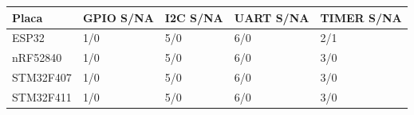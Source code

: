 \begin{tabular}{lllll}
\hline
Placa & GPIO S/NA & I2C S/NA & UART S/NA & TIMER S/NA \\
\hline
ESP32 & 1/0 & 5/0 & 6/0 & 2/1 \\
nRF52840 & 1/0 & 5/0 & 6/0 & 3/0 \\
STM32F407 & 1/0 & 5/0 & 6/0 & 3/0 \\
STM32F411 & 1/0 & 5/0 & 6/0 & 3/0 \\
\hline
\end{tabular}
